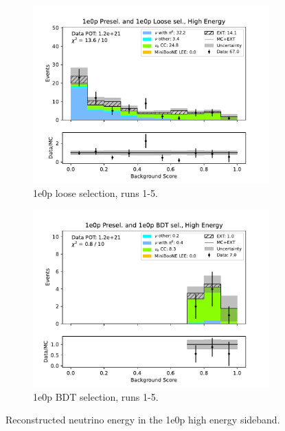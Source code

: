 \begin{figure}[H]
\begin{subfigure}{0.33\linewidth}
    \includegraphics[width=\linewidth]{technote/Sidebands/Figures/FarSideband/far_sideband_bkg_score_run1234a4b4c4d5_ZP_ZPLOOSESEL_HIGH_ENERGY.pdf}
    \caption{1e0p loose selection, runs 1-5.}
    \end{subfigure}%
    \begin{subfigure}{0.33\linewidth}
    \includegraphics[width=\linewidth]{technote/Sidebands/Figures/FarSideband/far_sideband_bkg_score_run1234a4b4c4d5_ZP_ZPBDT_HIGH_ENERGY.pdf}
    \caption{1e0p BDT selection, runs 1-5.}
    \end{subfigure}
    \caption{Reconstructed neutrino energy in the 1e0p high energy sideband.}
    \label{fig:HighEnergy1eNp_nonpi0_score}
\end{figure}